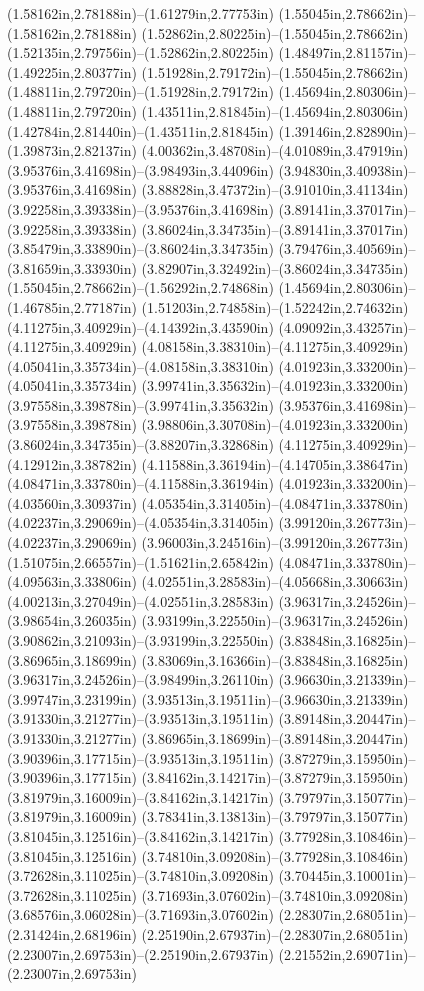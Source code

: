 (1.58162in,2.78188in)--(1.61279in,2.77753in) (1.55045in,2.78662in)--(1.58162in,2.78188in) (1.52862in,2.80225in)--(1.55045in,2.78662in) (1.52135in,2.79756in)--(1.52862in,2.80225in) (1.48497in,2.81157in)--(1.49225in,2.80377in) (1.51928in,2.79172in)--(1.55045in,2.78662in) (1.48811in,2.79720in)--(1.51928in,2.79172in) (1.45694in,2.80306in)--(1.48811in,2.79720in) (1.43511in,2.81845in)--(1.45694in,2.80306in) (1.42784in,2.81440in)--(1.43511in,2.81845in) (1.39146in,2.82890in)--(1.39873in,2.82137in) (4.00362in,3.48708in)--(4.01089in,3.47919in) (3.95376in,3.41698in)--(3.98493in,3.44096in) (3.94830in,3.40938in)--(3.95376in,3.41698in) (3.88828in,3.47372in)--(3.91010in,3.41134in) (3.92258in,3.39338in)--(3.95376in,3.41698in) (3.89141in,3.37017in)--(3.92258in,3.39338in) (3.86024in,3.34735in)--(3.89141in,3.37017in) (3.85479in,3.33890in)--(3.86024in,3.34735in) (3.79476in,3.40569in)--(3.81659in,3.33930in) (3.82907in,3.32492in)--(3.86024in,3.34735in) (1.55045in,2.78662in)--(1.56292in,2.74868in) (1.45694in,2.80306in)--(1.46785in,2.77187in) (1.51203in,2.74858in)--(1.52242in,2.74632in) (4.11275in,3.40929in)--(4.14392in,3.43590in) (4.09092in,3.43257in)--(4.11275in,3.40929in) (4.08158in,3.38310in)--(4.11275in,3.40929in) (4.05041in,3.35734in)--(4.08158in,3.38310in) (4.01923in,3.33200in)--(4.05041in,3.35734in) (3.99741in,3.35632in)--(4.01923in,3.33200in) (3.97558in,3.39878in)--(3.99741in,3.35632in) (3.95376in,3.41698in)--(3.97558in,3.39878in) (3.98806in,3.30708in)--(4.01923in,3.33200in) (3.86024in,3.34735in)--(3.88207in,3.32868in) (4.11275in,3.40929in)--(4.12912in,3.38782in) (4.11588in,3.36194in)--(4.14705in,3.38647in) (4.08471in,3.33780in)--(4.11588in,3.36194in) (4.01923in,3.33200in)--(4.03560in,3.30937in) (4.05354in,3.31405in)--(4.08471in,3.33780in) (4.02237in,3.29069in)--(4.05354in,3.31405in) (3.99120in,3.26773in)--(4.02237in,3.29069in) (3.96003in,3.24516in)--(3.99120in,3.26773in) (1.51075in,2.66557in)--(1.51621in,2.65842in) (4.08471in,3.33780in)--(4.09563in,3.33806in) (4.02551in,3.28583in)--(4.05668in,3.30663in) (4.00213in,3.27049in)--(4.02551in,3.28583in) (3.96317in,3.24526in)--(3.98654in,3.26035in) (3.93199in,3.22550in)--(3.96317in,3.24526in) (3.90862in,3.21093in)--(3.93199in,3.22550in) (3.83848in,3.16825in)--(3.86965in,3.18699in) (3.83069in,3.16366in)--(3.83848in,3.16825in) (3.96317in,3.24526in)--(3.98499in,3.26110in) (3.96630in,3.21339in)--(3.99747in,3.23199in) (3.93513in,3.19511in)--(3.96630in,3.21339in) (3.91330in,3.21277in)--(3.93513in,3.19511in) (3.89148in,3.20447in)--(3.91330in,3.21277in) (3.86965in,3.18699in)--(3.89148in,3.20447in) (3.90396in,3.17715in)--(3.93513in,3.19511in) (3.87279in,3.15950in)--(3.90396in,3.17715in) (3.84162in,3.14217in)--(3.87279in,3.15950in) (3.81979in,3.16009in)--(3.84162in,3.14217in) (3.79797in,3.15077in)--(3.81979in,3.16009in) (3.78341in,3.13813in)--(3.79797in,3.15077in) (3.81045in,3.12516in)--(3.84162in,3.14217in) (3.77928in,3.10846in)--(3.81045in,3.12516in) (3.74810in,3.09208in)--(3.77928in,3.10846in) (3.72628in,3.11025in)--(3.74810in,3.09208in) (3.70445in,3.10001in)--(3.72628in,3.11025in) (3.71693in,3.07602in)--(3.74810in,3.09208in) (3.68576in,3.06028in)--(3.71693in,3.07602in) (2.28307in,2.68051in)--(2.31424in,2.68196in) (2.25190in,2.67937in)--(2.28307in,2.68051in) (2.23007in,2.69753in)--(2.25190in,2.67937in) (2.21552in,2.69071in)--(2.23007in,2.69753in) 
